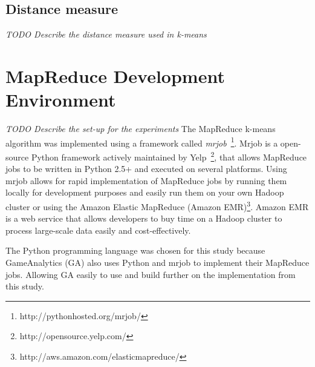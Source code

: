 \lipsum[7-8]


\subsection{Distance measure}
\textit{TODO Describe the distance measure used in k-means}

\lipsum[1]


\section{MapReduce Development Environment}
\textit{TODO Describe the set-up for the experiments}
The MapReduce k-means algorithm was implemented using a framework called \textit{mrjob}~\footnote{http://pythonhosted.org/mrjob/}. Mrjob is a open-source Python framework actively maintained by Yelp~\footnote{http://opensource.yelp.com/}, that allows MapReduce jobs to be written in Python 2.5+ and executed on several platforms. Using mrjob allows for rapid implementation of MapReduce jobs by running them locally for development purposes and easily run them on your own Hadoop cluster or using the Amazon Elastic MapReduce (Amazon EMR)\footnote{http://aws.amazon.com/elasticmapreduce/}. Amazon EMR is a web service that allows developers to buy time on a Hadoop cluster to process large-scale data easily and cost-effectively.

The Python programming language was chosen for this study because GameAnalytics (GA) also uses Python and mrjob to implement their MapReduce jobs. Allowing GA easily to use and build further on the implementation from this study. 
\lipsum[1-3]